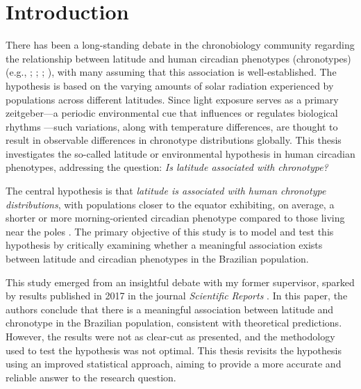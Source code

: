 \documentclass[
12pt,
openright,
oneside,
a4paper,
chapter=TITLE,
section=TITLE,
french,
spanish,
brazil,
english
]{abntex2}
\renewcommand{\contentsname}{Contents}
\renewcommand{\contentsname}{Sumário}
\renewcommand{\contentsname}{Sumario}
\renewcommand{\contentsname}{Sommaire}
\renewcommand{\textual}{
  \pagestyle{abntheadings}
  \aliaspagestyle{chapter}{abntheadings}
}
\renewcommand*\contentsname{Table of Contents}
\newcommand\contentsname{Table of Contents}
\begin{document}

\pdfbookmark[0]{\contentsname}{toc}
\tableofcontents*
\cleardoublepage




\textual
{}

\chapter{Introduction}\label{sec-introduction}

There has been a long-standing debate in the chronobiology community
regarding the relationship between latitude and human circadian
phenotypes (chronotypes) (e.g., \textcite{bohlen1973};
\textcite{randler2008}; \textcite{leocadio-miguel2017};
\textcite{wang2023}), with many assuming that this association is
well-established. The hypothesis is based on the varying amounts of
solar radiation experienced by populations across different latitudes.
Since light exposure serves as a primary zeitgeber---a periodic
environmental cue that influences or regulates biological rhythms
\autocite{aschoff1960,pittendrigh1960}---such variations, along with
temperature differences, are thought to result in observable differences
in chronotype distributions globally. This thesis investigates the
so-called latitude or environmental hypothesis in human circadian
phenotypes, addressing the question: \emph{Is latitude associated with
chronotype?}

The central hypothesis is that \emph{latitude is associated with human
chronotype distributions}, with populations closer to the equator
exhibiting, on average, a shorter or more morning-oriented circadian
phenotype compared to those living near the poles
\autocite{bohlen1973,randler2008,leocadio-miguel2014,horzum2015,leocadio-miguel2017}.
The primary objective of this study is to model and test this hypothesis
by critically examining whether a meaningful association exists between
latitude and circadian phenotypes in the Brazilian population.

This study emerged from an insightful debate with my former supervisor,
sparked by results published in 2017 in the journal \emph{Scientific
Reports} \autocite{leocadio-miguel2017}. In this paper, the authors
conclude that there is a meaningful association between latitude and
chronotype in the Brazilian population, consistent with theoretical
predictions. However, the results were not as clear-cut as presented,
and the methodology used to test the hypothesis was not optimal. This
thesis revisits the hypothesis using an improved statistical approach,
aiming to provide a more accurate and reliable answer to the research
question.
\end{document}
